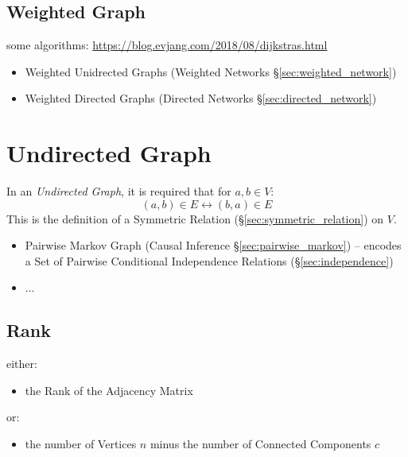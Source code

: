 \subsection{Weighted Graph}\label{sec:weighted_graph}

some algorithms: \url{https://blog.evjang.com/2018/08/dijkstras.html}

\begin{itemize}
  \item Weighted Unidrected Graphs (Weighted Networks
    \S\ref{sec:weighted_network})
  \item Weighted Directed Graphs (Directed Networks
    \S\ref{sec:directed_network})
\end{itemize}



\section{Undirected Graph}\label{sec:undirected_graph}

In an \emph{Undirected Graph}, it is required that for $a,b \in V$:
\[
    (a,b) \in E \leftrightarrow (b,a) \in E
\]
This is the definition of a Symmetric Relation
(\S\ref{sec:symmetric_relation}) on $V$.

\begin{itemize}
  \item Pairwise Markov Graph (Causal Inference \S\ref{sec:pairwise_markov}) --
    encodes a Set of Pairwise Conditional Independence Relations
    (\S\ref{sec:independence})
  \item ...
\end{itemize}



\subsection{Rank}\label{sec:graph_rank}

either:
\begin{itemize}
  \item the Rank of the Adjacency Matrix
\end{itemize}
or:
\begin{itemize}
  \item the number of Vertices $n$ minus the number of Connected Components $c$
\end{itemize}



